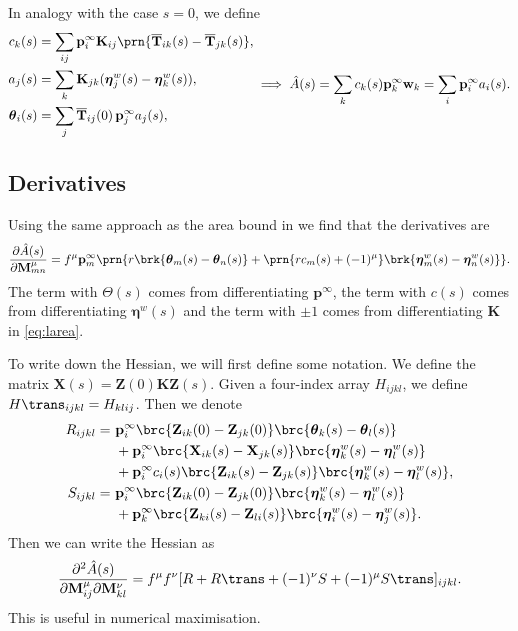\documentclass[12pt]{article}
\newcommand{\pr}{\mathbf{p}}
\newcommand{\eq}{\pr^\infty}
\newcommand{\fpt}{\mathbf{T}}
\newcommand{\fptb}{\overline{\fpt}}
\newcommand{\fund}{\mathbf{Z}}
\newcommand{\etw}{\boldsymbol{\eta}^w}
\newcommand{\thb}{\boldsymbol{\theta}}
\newcommand{\w}{\mathbf{w}}
\newcommand{\M}{\mathbf{M}}
\newcommand{\enc}{\mathbf{K}}
\renewcommand{\pdiff}[2]{\frac{\partial #1}{\partial #2}}
\begin{document}
In analogy with the case $s=0$, we define
%
\begin{equation}\label{eq:lareacoeffs}
  \begin{aligned}
    c_k(s) &= \sum_{ij} \eq_i \enc_{ij} \prn{\fptb_{ik}(s)-\fptb_{jk}(s)}, \\
    a_j(s) &= \sum_{k} \enc_{jk} (\etw_{j}(s) - \etw_{k}(s)), \\
    \thb_i(s) &= \sum_j \fptb_{ij}(0)\, \eq_j a_j(s), \\
  \end{aligned}
    \implies
    \hat{A}(s) = \sum_k c_k(s) \eq_k \w_k
      = \sum_i  \eq_i a_i(s).
\end{equation}
%

\subsection{Derivatives}\label{sec:lderiv}

Using the same approach as the area bound in \cite{Lahiri2013synapse} we find that the derivatives are
%
\begin{equation}\label{eq:lAdiff}
  \pdiff{\hat{A}(s)}{\M^\mu_{mn}}
     = f^\mu \eq_m \prn{ r \brk{\thb_m(s) - \thb_n(s)}
     +\prn{rc_m(s) + (-1)^\mu} \brk{\etw_m(s) - \etw_n(s)} }.
\end{equation}
%
The term with $\Theta(s)$ comes from differentiating $\eq$, the term with $c(s)$ comes from differentiating $\etw(s)$ and the term with $\pm1$ comes from differentiating $\enc$ in \eqref{eq:larea}.

To write down the Hessian, we will first define some notation.
We define the matrix $\mathbf{X}(s) = \fund(0) \enc \fund(s)$.
Given a four-index array $H_{ijkl}$, we define $H\trans_{ijkl} = H_{klij}$.
Then we denote
%
\begin{equation}\label{eq:hessparts}
\begin{alignedat}{3}
    R_{ijkl} &= \
    &&\eq_i \brc{\fund_{ik}(0) - \fund_{jk}(0)} \brc{\thb_k(s) - \thb_l(s)} \\
    &&&+ \eq_i \brc{\mathbf{X}_{ik}(s) - \mathbf{X}_{jk}(s)} 
          \brc{\etw_k(s) - \etw_l(s)} \\
    &&&+ \eq_i c_i(s) \brc{\fund_{ik}(s) - \fund_{jk}(s)} 
          \brc{\etw_k(s) - \etw_l(s)},  \\
  S_{ijkl} &=
    &&\eq_i \brc{\fund_{ik}(0) - \fund_{jk}(0)} \brc{\etw_k(s) - \etw_l(s)} \\
    &&&+ \eq_k \brc{\fund_{ki}(s) - \fund_{li}(s)} \brc{\etw_i(s) - \etw_j(s)}.
\end{alignedat}
\end{equation}
%
Then we can write the Hessian as
%
\begin{equation}\label{eq:hessian}
  \pdiff{^2\hat{A}(s)}{\M^\mu_{ij} \partial\M^\nu_{kl}} =
     f^\mu f^\nu [R + R\trans + (-1)^\nu S + (-1)^\mu S\trans]_{ijkl}.
\end{equation}
%
This is useful in numerical maximisation.
\end{document}
